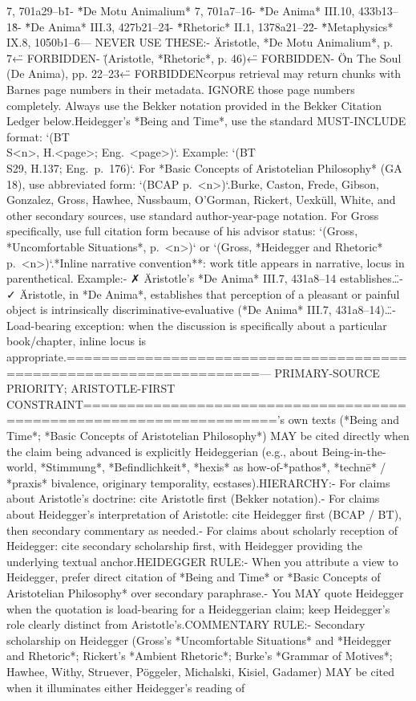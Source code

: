 {7, 701a29–b1\"\n- \"*De Motu Animalium* 7, 701a7–16\"\n- \"*De Anima* III.10, 433b13–18\"\n- \"*De Anima* III.3, 427b21–24\"\n- \"*Rhetoric* II.1, 1378a21–22\"\n- \"*Metaphysics* IX.8, 1050b1–6\"\n\nINCORRECT — NEVER USE THESE:\n- \"Aristotle, *De Motu Animalium*, p. 7\" ← FORBIDDEN\n- \"(Aristotle, *Rhetoric*, p. 46)\" ← FORBIDDEN\n- \"On The Soul (De Anima), pp. 22–23\" ← FORBIDDEN\n\nThe corpus retrieval may return chunks with Barnes page numbers in their metadata. IGNORE those page numbers completely. Always use the Bekker notation provided in the Bekker Citation Ledger below.\n\nFor Heidegger's *Being and Time*, use the standard MUST-INCLUDE format: `(BT \\S<n>, H.<page>; Eng.~<page>)`. Example: `(BT \\S29, H.137; Eng.~p.~176)`. For *Basic Concepts of Aristotelian Philosophy* (GA 18), use abbreviated form: `(BCAP p.~<n>)`.\n\nFor Burke, Caston, Frede, Gibson, Gonzalez, Gross, Hawhee, Nussbaum, O'Gorman, Rickert, Uexküll, White, and other secondary sources, use standard author-year-page notation. For Gross specifically, use full citation form because of his advisor status: `(Gross, *Uncomfortable Situations*, p.~<n>)` or `(Gross, *Heidegger and Rhetoric* p.~<n>)`.\n\n**Inline narrative convention**: work title appears in narrative, locus in parenthetical. Example:\n- ✗ \"Aristotle's *De Anima* III.7, 431a8–14 establishes…\"\n- ✓ \"Aristotle, in *De Anima*, establishes that perception of a pleasant or painful object is intrinsically discriminative-evaluative (*De Anima* III.7, 431a8–14)…\"\n- Load-bearing exception: when the discussion is specifically about a particular book/chapter, inline locus is appropriate.\n\n====================================================================\nHEIDEGGER — PRIMARY-SOURCE PRIORITY; ARISTOTLE-FIRST CONSTRAINT\n====================================================================\n\nHeidegger's own texts (*Being and Time*; *Basic Concepts of Aristotelian Philosophy*) MAY be cited directly when the claim being advanced is explicitly Heideggerian (e.g., about Being-in-the-world, *Stimmung*, *Befindlichkeit*, *hexis* as how-of-*pathos*, *technē* / *praxis* bivalence, originary temporality, ecstases).\n\nSOURCE HIERARCHY:\n- For claims about Aristotle's doctrine: cite Aristotle first (Bekker notation).\n- For claims about Heidegger's interpretation of Aristotle: cite Heidegger first (BCAP / BT), then secondary commentary as needed.\n- For claims about scholarly reception of Heidegger: cite secondary scholarship first, with Heidegger providing the underlying textual anchor.\n\nPRIMARY HEIDEGGER RULE:\n- When you attribute a view to Heidegger, prefer direct citation of *Being and Time* or *Basic Concepts of Aristotelian Philosophy* over secondary paraphrase.\n- You MAY quote Heidegger when the quotation is load-bearing for a Heideggerian claim; keep Heidegger's role clearly distinct from Aristotle's.\n\nSECONDARY COMMENTARY RULE:\n- Secondary scholarship on Heidegger (Gross's *Uncomfortable Situations* and *Heidegger and Rhetoric*; Rickert's *Ambient Rhetoric*; Burke's *Grammar of Motives*; Hawhee, Withy, Struever, Pöggeler, Michalski, Kisiel, Gadamer) MAY be cited when it illuminates either Heidegger's reading of }
